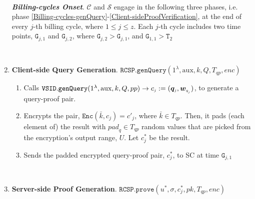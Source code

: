 \begin{enumerate}
\

\textbf{\textit{Billing-cycles Onset}}. $\mathcal{C}$ and $\mathcal{S}$ engage in the following three phases, i.e. phase \ref{Billing-cycles-genQuery}-\ref{Client-sideProofVerification},  at the end of every $j$-th billing cycle, where $1\leq j\leq z$. Each $j$-th cycle includes two  time points, $\texttt{G}_{\scriptscriptstyle j,1}$ and $\texttt{G}_{\scriptscriptstyle j,2}$, where $\texttt{G}_{\scriptscriptstyle j,2}>\texttt{G}_{\scriptscriptstyle j,1}$, and $\texttt{G}_{\scriptscriptstyle 1,1}>\texttt{T}_{\scriptscriptstyle 2}$ 




\

\item\textbf{Client-side Query Generation}.\label{Billing-cycles-genQuery} $\mathtt{RCSP}.\mathtt{genQuery}(1^\lambda, \text{aux},k,Q, T_{\scriptscriptstyle qp}, enc)$

\begin{enumerate}
\item Calls $\mathtt{VSID.genQuery}(1^{\lambda},  \text{aux},k,Q, {pp})\rightarrow c_{\scriptscriptstyle j}:=(\bm{q}_{\scriptscriptstyle j},\bm{w}_{\scriptscriptstyle q_{_{\scaleto{j}{\size}}}})$, to generate a query-proof pair. 
\item Encrypts the pair, $\mathtt{Enc}(\bar{k},c_{\scriptscriptstyle j})=c'_{\scriptscriptstyle j}$, where $\bar{k}\in T_{\scriptscriptstyle qp}$. Then, it pads (each element of) the result with ${pad}_{\scriptscriptstyle q}\in T_{\scriptscriptstyle qp}$ random values that are picked from the encryption's output range, $U$. Let $c^{\scriptscriptstyle *}_{\scriptscriptstyle j}$ be the result. 
\item Sends the padded encrypted query-proof pair, $c^{\scriptscriptstyle *}_{\scriptscriptstyle j}$, to SC at time $\texttt{G}_{\scriptscriptstyle j,1}$
\end{enumerate}

\

\item\textbf{Server-side Proof Generation}. $\mathtt{RCSP}.\mathtt{prove}(u^{\scriptscriptstyle *},  \sigma,  c^{\scriptscriptstyle *}_{\scriptscriptstyle j}, pk, T_{\scriptscriptstyle qp}, enc)$



\end{enumerate}

